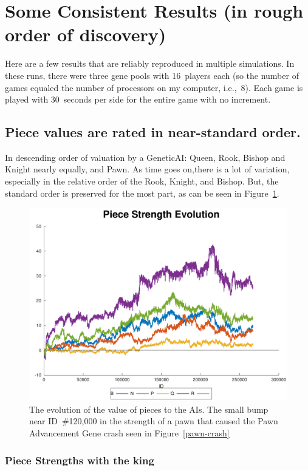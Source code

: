 \documentclass[letterpaper]{article}
\renewcommand{\_}{\allowbreak\textunderscore\allowbreak}
\begin{document}
\section{Some Consistent Results (in rough order of discovery)}

Here are a few results that are reliably reproduced in multiple simulations. In these runs, there were three gene pools with 16~players each (so the number of games equaled the number of processors on my computer, i.e.,~8). Each game is played with 30~seconds per side for the entire game with no increment.

\subsection{Piece values are rated in near-standard order.}
In descending order of valuation by a Genetic\_AI\@: Queen, Rook, Bishop and Knight nearly equally, and Pawn. As time goes on,there is a lot of variation, especially in the relative order of the Rook, Knight, and Bishop. But, the standard order is preserved for the most part, as can be seen in Figure~\ref{piece-value-plot}.
\begin{figure}[htb]
	\centering
	\includegraphics[width=\textwidth]{pawn-crash-strength-plot}
	\caption{The evolution of the value of pieces to the AIs. The small bump near ID~\#120,000 in the strength of a pawn that caused the Pawn Advancement Gene crash seen in Figure~\ref{pawn-crash}}\label{piece-value-plot}
\end{figure}

\subsubsection{Piece Strengths with the king}\label{piece-strength-with-king}
\end{document}
